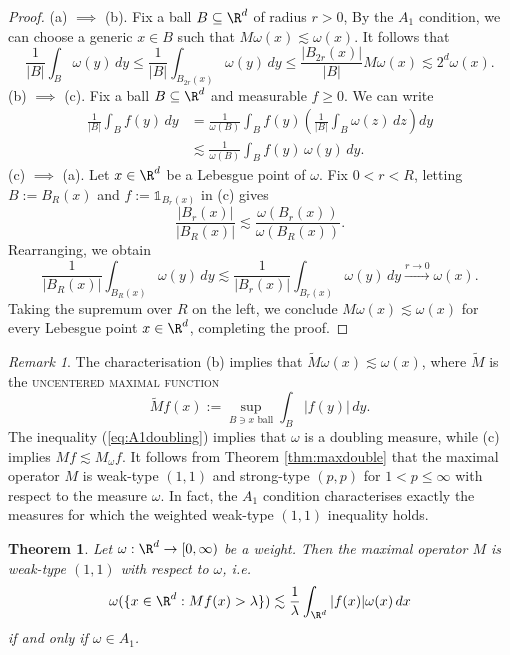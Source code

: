 \documentclass[reqno]{amsart}
\newtheorem{theorem}{Theorem}
\theoremstyle{definition}
\theoremstyle{remark}
\newtheorem*{remark}{Remark}
\renewcommand{\emph}{\textsc}
\begin{document}
\begin{proof}
	(a) $\implies$ (b). Fix a ball $B \subseteq \R^d$ of radius $r > 0$, By the $A_1$ condition, we can choose a generic $x \in B$ such that $M\omega(x) \lesssim \omega (x)$. It follows that
		\[ \frac{1}{|B|} \int_B \omega(y) \, dy \leq \frac{1}{|B|} \int_{B_{2r} (x)} \omega(y) \, dy \leq \frac{|B_{2r}(x)|}{|B|} M\omega (x) \lesssim 2^d \omega(x). \]
	(b) $\implies$ (c). Fix a ball $B \subseteq \R^d$ and measurable $f \geq 0$. We can write 
		\begin{align*}
			 \frac{1}{|B|} \int_B f(y) \, dy 
			 	&= \frac{1}{\omega(B)} \int_B f(y) \left( \frac{1}{|B|} \int_B \omega(z) \, dz \right) dy \\
			 	&\lesssim \frac{1}{\omega(B)} \int_B f(y) \, \omega(y) \, dy.
		\end{align*}	 
	(c) $\implies$ (a). Let $x \in \R^d$ be a Lebesgue point of $\omega$. Fix $0 < r < R$, letting $B := B_R (x)$ and $f := \mathbb 1_{B_r (x)}$ in (c) gives
		\begin{equation}
			 \frac{|B_r (x)|}{|B_R (x)|} \lesssim \frac{\omega(B_r (x))}{\omega (B_R (x))}. \tag{*} \label{eq:A1doubling} 
		\end{equation} 
	Rearranging, we obtain
		\[ \frac{1}{|B_R (x)|} \int_{B_R (x)} \omega(y) \, dy \lesssim \frac{1}{|B_r (x)|} \int_{B_r (x)} \omega(y) \, dy \overset{r \to 0}{\longrightarrow} \omega(x). \]
	Taking the supremum over $R$ on the left, we conclude $M\omega(x) \lesssim \omega(x)$ for every Lebesgue point $x \in \R^d$, completing the proof. 		
\end{proof}

\begin{remark}
	The characterisation (b) implies that $\widetilde M \omega (x) \lesssim \omega(x)$, where $\widetilde M$ is the \emph{uncentered maximal function}
		\[ \widetilde M f(x) := \sup_{B \ni x \text{ ball}} \int_B |f(y)| \, dy. \]
	The inequality (\ref{eq:A1doubling}) implies that $\omega$ is a doubling measure, while (c) implies $Mf \lesssim M_\omega f$. It follows from Theorem \ref{thm:maxdouble} that the maximal operator $M$ is weak-type $(1, 1)$ and strong-type $(p, p)$ for $1 < p \leq \infty$ with respect to the measure $\omega$. In fact, the $A_1$ condition characterises exactly the measures for which the weighted weak-type $(1, 1)$ inequality holds. 
\end{remark}

\begin{theorem}
	Let $\omega : \R^d \to [0, \infty)$ be a weight. Then the maximal operator $M$ is weak-type $(1, 1)$ with respect to $\omega$, i.e.
		\[ \omega ( \{ x \in \R^d : Mf(x) > \lambda \} )\lesssim \frac1\lambda \int_{\R^d} |f(x)| \omega(x) \, dx \]
	if and only if $\omega \in A_1$. 	\label{thm:weak11a1}
\end{theorem}
\end{document}
